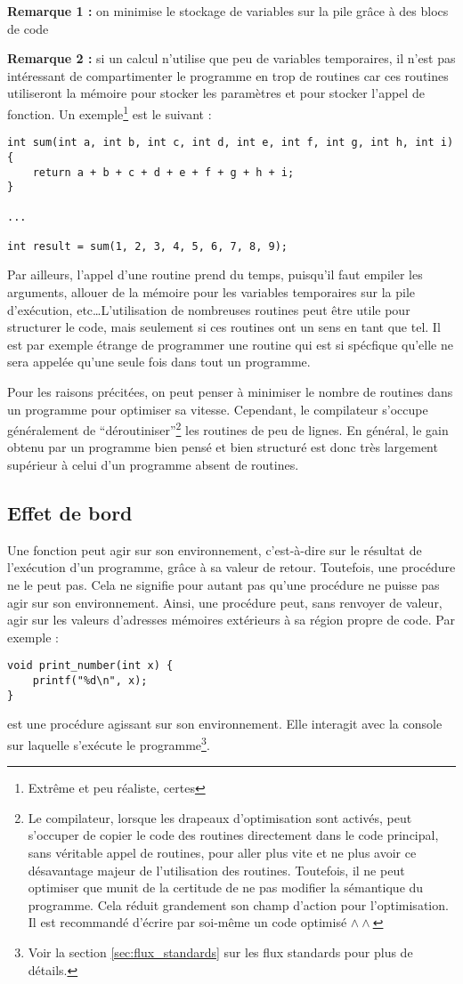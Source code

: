 \documentclass[../../../main.tex]{subfiles}
\begin{document}
\textbf{Remarque 1 :} on minimise le stockage de variables sur la pile grâce à des blocs de code

\textbf{Remarque 2 :} si un calcul n'utilise que peu de variables temporaires, il n'est pas intéressant de compartimenter le programme en trop de routines car ces routines utiliseront la mémoire pour stocker les paramètres et pour stocker l'appel de fonction. Un exemple\footnote{Extrême et peu réaliste, certes} est le suivant :
\begin{verbatim}
int sum(int a, int b, int c, int d, int e, int f, int g, int h, int i) {
	return a + b + c + d + e + f + g + h + i;
}

...

int result = sum(1, 2, 3, 4, 5, 6, 7, 8, 9);
\end{verbatim}

Par ailleurs, l'appel d'une routine prend du temps, puisqu'il faut empiler les arguments, allouer de la mémoire pour les variables temporaires sur la pile d'exécution, etc\dots L'utilisation de nombreuses routines peut être utile pour structurer le code, mais seulement si ces routines ont un sens en tant que tel. Il est par exemple étrange de programmer une routine qui est si spécfique qu'elle ne sera appelée qu'une seule fois dans tout un programme.

Pour les raisons précitées, on peut penser à minimiser le nombre de routines dans un programme pour optimiser sa vitesse. Cependant, le compilateur s'occupe généralement de ``déroutiniser''\footnote{Le compilateur, lorsque les drapeaux d'optimisation sont activés, peut s'occuper de copier le code des routines directement dans le code principal, sans véritable appel de routines, pour aller plus vite et ne plus avoir ce désavantage majeur de l'utilisation des routines. Toutefois, il ne peut optimiser que munit de la certitude de ne pas modifier la sémantique du programme. Cela réduit grandement son champ d'action pour l'optimisation. Il est recommandé d'écrire par soi-même un code optimisé $\wedge\wedge$} les routines de peu de lignes. En général, le gain obtenu par un programme bien pensé et bien structuré est donc très largement supérieur à celui d'un programme absent de routines.
\subsection{Effet de bord}
\label{sub:effet_de_bord}
Une fonction peut agir sur son environnement, c'est-à-dire sur le résultat de l'exécution d'un programme, grâce à sa valeur de retour. Toutefois, une procédure ne le peut pas. Cela ne signifie pour autant pas qu'une procédure ne puisse pas agir sur son environnement. Ainsi, une procédure peut, sans renvoyer de valeur, agir sur les valeurs d'adresses mémoires extérieurs à sa région propre de code. Par exemple :
\begin{verbatim}
void print_number(int x) {
	printf("%d\n", x);
}
\end{verbatim}
est une procédure agissant sur son environnement. Elle interagit avec la console sur laquelle s'exécute le programme\footnote{Voir la section \ref{sec:flux_standards} sur les flux standards pour plus de détails.}.
\end{document}
